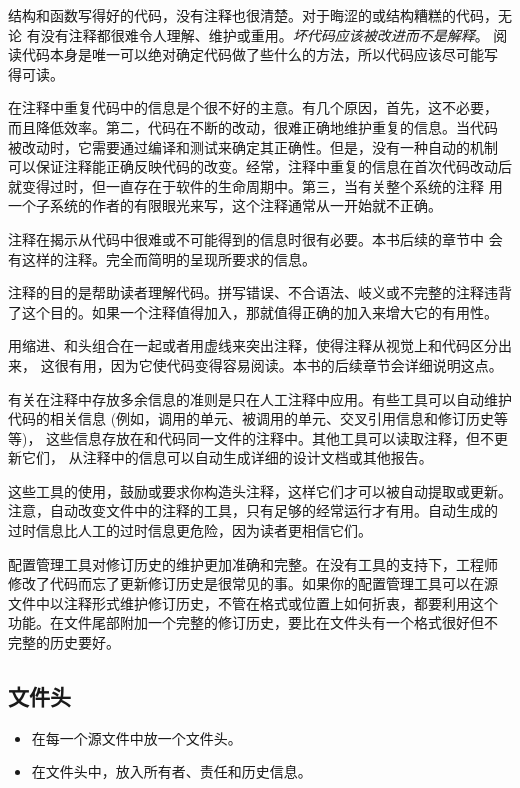\begin{blockindent}
结构和函数写得好的代码，没有注释也很清楚。对于晦涩的或结构糟糕的代码，无论
有没有注释都很难令人理解、维护或重用。\emph{坏代码应该被改进而不是解释}。
阅读代码本身是唯一可以绝对确定代码做了些什么的方法，所以代码应该尽可能写
得可读。

在注释中重复代码中的信息是个很不好的主意。有几个原因，首先，这不必要，
而且降低效率。第二，代码在不断的改动，很难正确地维护重复的信息。当代码
被改动时，它需要通过编译和测试来确定其正确性。但是，没有一种自动的机制
可以保证注释能正确反映代码的改变。经常，注释中重复的信息在首次代码改动后
就变得过时，但一直存在于软件的生命周期中。第三，当有关整个系统的注释
用一个子系统的作者的有限眼光来写，这个注释通常从一开始就不正确。

注释在揭示从代码中很难或不可能得到的信息时很有必要。本书后续的章节中
会有这样的注释。完全而简明的呈现所要求的信息。

注释的目的是帮助读者理解代码。拼写错误、不合语法、岐义或不完整的注释违背
了这个目的。如果一个注释值得加入，那就值得正确的加入来增大它的有用性。

用缩进、和头组合在一起或者用虚线来突出注释，使得注释从视觉上和代码区分出来，
这很有用，因为它使代码变得容易阅读。本书的后续章节会详细说明这点。
\end{blockindent}

\begin{blockindent}
有关在注释中存放多余信息的准则是只在人工注释中应用。有些工具可以自动维护
代码的相关信息 (例如，调用的单元、被调用的单元、交叉引用信息和修订历史等等)，
这些信息存放在和代码同一文件的注释中。其他工具可以读取注释，但不更新它们，
从注释中的信息可以自动生成详细的设计文档或其他报告。

这些工具的使用，鼓励或要求你构造头注释，这样它们才可以被自动提取或更新。
注意，自动改变文件中的注释的工具，只有足够的经常运行才有用。自动生成的
过时信息比人工的过时信息更危险，因为读者更相信它们。

配置管理工具对修订历史的维护更加准确和完整。在没有工具的支持下，工程师
修改了代码而忘了更新修订历史是很常见的事。如果你的配置管理工具可以在源
文件中以注释形式维护修订历史，不管在格式或位置上如何折衷，都要利用这个
功能。在文件尾部附加一个完整的修订历史，要比在文件头有一个格式很好但不
完整的历史要好。
\end{blockindent}

\subsection{文件头}
\begin{itemize}
    \item 在每一个源文件中放一个文件头。
    \item 在文件头中，放入所有者、责任和历史信息。
\end{itemize}

